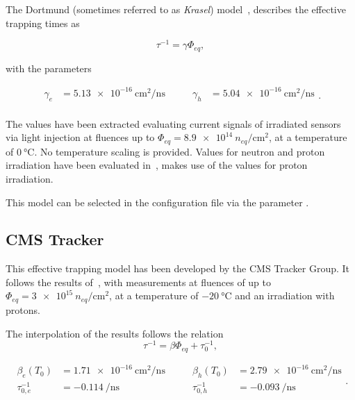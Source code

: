 The Dortmund (sometimes referred to as \textit{Krasel}) model~\cite{dortmundTrapping}, describes the effective trapping times as

\begin{equation*}
    \tau^{-1} = \gamma\Phi_{eq} ,
\end{equation*}

with the parameters

\begin{equation*}
    \begin{split}
        \gamma_{e} &= \SI{5.13e-16}{\cm^2 \per \ns} \\
    \end{split}
    \qquad
    \begin{split}
        \gamma_{h} &= \SI{5.04e-16}{\cm^2 \per \ns} \\
    \end{split}.
\end{equation*}

The values have been extracted evaluating current signals of irradiated sensors via light injection at fluences up to $\Phi_{eq} = \SI{8.9e14}{n_{eq} \per \cm^2}$, at a temperature of $\SI{0}{\celsius}$.
No temperature scaling is provided.
Values for neutron and proton irradiation have been evaluated in~\cite{dortmundTrapping}, \apsq makes use of the values for proton irradiation.

This model can be selected in the configuration file via the parameter .

\subsection{CMS Tracker}

This effective trapping model has been developed by the CMS Tracker Group.
It follows the results of~\cite{CMSTrackerTrapping}, with measurements at fluences of up to $\Phi_{eq} = \SI{3e15}{n_{eq} \per \cm^2}$, at a temperature of $\SI{-20}{\celsius}$ and an irradiation with protons.

The interpolation of the results follows the relation
\begin{equation*}
    \tau^{-1} = {\beta\Phi_{eq}} + \tau_0^{-1} ,
\end{equation*}

\begin{equation*}
    \begin{split}
        \beta_{e}(T_0) &= \SI{1.71e-16}{\cm^2 \per \ns} \\
        \tau_{0,e}^{-1}   &= \SI{-0.114}{\per \ns} \\
    \end{split}
    \qquad
    \begin{split}
        \beta_{h}(T_0) &= \SI{2.79e-16}{\cm^2 \per \ns} \\
        \tau_{0,h}^{-1}   &= \SI{-0.093}{\per \ns} \\
    \end{split}.
\end{equation*}

